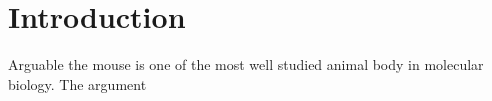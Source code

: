 \section{Introduction}

Arguable the mouse is one of the most well studied animal body in molecular biology. The argument 